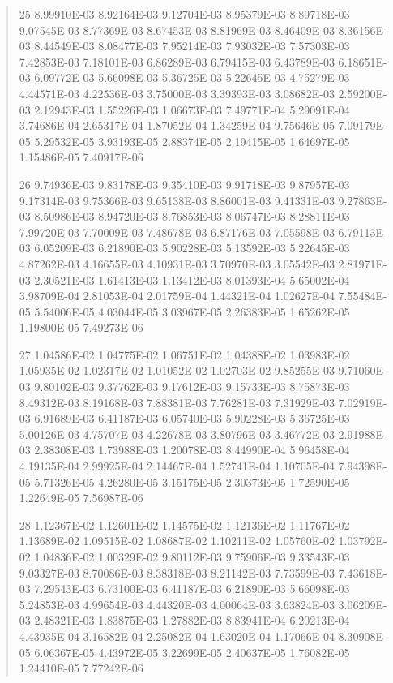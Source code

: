 \documentclass[letterpaper,10pt,english]{sphinxmanual}
\begin{document}
\begin{quote}
\begin{DUlineblock}{0em}
\item[] 25   8.99910E-03  8.92164E-03  9.12704E-03  8.95379E-03  8.89718E-03  9.07545E-03  8.77369E-03  8.67453E-03  8.81969E-03  8.46409E-03  8.36156E-03  8.44549E-03  8.08477E-03  7.95214E-03  7.93032E-03  7.57303E-03  7.42853E-03  7.18101E-03  6.86289E-03  6.79415E-03  6.43789E-03  6.18651E-03  6.09772E-03  5.66098E-03  5.36725E-03  5.22645E-03  4.75279E-03  4.44571E-03  4.22536E-03  3.75000E-03  3.39393E-03  3.08682E-03  2.59200E-03  2.12943E-03  1.55226E-03  1.06673E-03  7.49771E-04  5.29091E-04  3.74686E-04  2.65317E-04  1.87052E-04  1.34259E-04  9.75646E-05  7.09179E-05  5.29532E-05  3.93193E-05  2.88374E-05  2.19415E-05  1.64697E-05  1.15486E-05  7.40917E-06
\item[] 26   9.74936E-03  9.83178E-03  9.35410E-03  9.91718E-03  9.87957E-03  9.17314E-03  9.75366E-03  9.65138E-03  8.86001E-03  9.41331E-03  9.27863E-03  8.50986E-03  8.94720E-03  8.76853E-03  8.06747E-03  8.28811E-03  7.99720E-03  7.70009E-03  7.48678E-03  6.87176E-03  7.05598E-03  6.79113E-03  6.05209E-03  6.21890E-03  5.90228E-03  5.13592E-03  5.22645E-03  4.87262E-03  4.16655E-03  4.10931E-03  3.70970E-03  3.05542E-03  2.81971E-03  2.30521E-03  1.61413E-03  1.13412E-03  8.01393E-04  5.65002E-04  3.98709E-04  2.81053E-04  2.01759E-04  1.44321E-04  1.02627E-04  7.55484E-05  5.54006E-05  4.03044E-05  3.03967E-05  2.26383E-05  1.65262E-05  1.19800E-05  7.49273E-06
\item[] 27   1.04586E-02  1.04775E-02  1.06751E-02  1.04388E-02  1.03983E-02  1.05935E-02  1.02317E-02  1.01052E-02  1.02703E-02  9.85255E-03  9.71060E-03  9.80102E-03  9.37762E-03  9.17612E-03  9.15733E-03  8.75873E-03  8.49312E-03  8.19168E-03  7.88381E-03  7.76281E-03  7.31929E-03  7.02919E-03  6.91689E-03  6.41187E-03  6.05740E-03  5.90228E-03  5.36725E-03  5.00126E-03  4.75707E-03  4.22678E-03  3.80796E-03  3.46772E-03  2.91988E-03  2.38308E-03  1.73988E-03  1.20078E-03  8.44990E-04  5.96458E-04  4.19135E-04  2.99925E-04  2.14467E-04  1.52741E-04  1.10705E-04  7.94398E-05  5.71326E-05  4.26280E-05  3.15175E-05  2.30373E-05  1.72590E-05  1.22649E-05  7.56987E-06
\item[] 28   1.12367E-02  1.12601E-02  1.14575E-02  1.12136E-02  1.11767E-02  1.13689E-02  1.09515E-02  1.08687E-02  1.10211E-02  1.05760E-02  1.03792E-02  1.04836E-02  1.00329E-02  9.80112E-03  9.75906E-03  9.33543E-03  9.03327E-03  8.70086E-03  8.38318E-03  8.21142E-03  7.73599E-03  7.43618E-03  7.29543E-03  6.73100E-03  6.41187E-03  6.21890E-03  5.66098E-03  5.24853E-03  4.99654E-03  4.44320E-03  4.00064E-03  3.63824E-03  3.06209E-03  2.48321E-03  1.83875E-03  1.27882E-03  8.83941E-04  6.20213E-04  4.43935E-04  3.16582E-04  2.25082E-04  1.63020E-04  1.17066E-04  8.30908E-05  6.06367E-05  4.43972E-05  3.22699E-05  2.40637E-05  1.76082E-05  1.24410E-05  7.77242E-06

\end{DUlineblock}
\end{quote}
\end{document}
